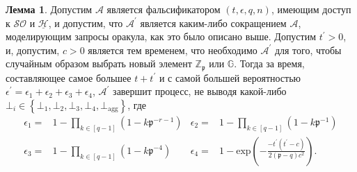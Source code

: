 \documentclass{mrl}
\theoremstyle{definition}
\numberwithin{theorem}{subsection}
\newtheorem{lemma}[theorem]{Лемма}
\newcommand{\adversary}{\mathcal{A}}
\newcommand{\group}{\mathbb{G}}
\begin{document}
\begin{lemma}\label{firstNonFail}
Допустим $\mathcal{A}$ является фальсификатором $(t,\epsilon,q,n)$, имеющим доступ к $\mathcal{SO}$ и $\underline{\mathcal{H}}$, и допустим, что $\adversary^\prime$ является каким-либо сокращением $\mathcal{A}$, моделирующим запросы оракула, как это было описано выше. Допустим $t^\prime > 0$, и, допустим, $c > 0$ является тем временем, что необходимо $\adversary^\prime$ для того, чтобы случайным образом выбрать новый элемент $\mathbb{Z}_\mathfrak{p}$ или $\group$. Тогда за время, составляющее самое большее $t+t^\prime$ и с самой большей вероятностью $\epsilon^\prime = \epsilon_1 + \epsilon_2 + \epsilon_3 + \epsilon_4$, $\adversary^\prime$ завершит процесс, не выводя какой-либо $\bot_i \in \left\{\bot_1, \bot_2, \bot_3, \bot_4, \bot_{\text{agg}}\right\}$, где
\begin{align*}
\epsilon_1 =& 1 - \prod_{k \in [q-1]} (1-k \mathfrak{p}^{-r-1}) &
\epsilon_2 =& 1 - \prod_{k \in [q-1]} (1-k \mathfrak{p}^{-1}) \\
\epsilon_3 =& 1 - \prod_{k \in [q-1]} (1-k \mathfrak{p}^{-4}) &
\epsilon_4 =& 1 - \text{exp}(-\frac{-t^\prime(t^\prime-c)}{2(\mathfrak{p}-q)c^2}).
\end{align*}
\end{lemma}
\end{document}

